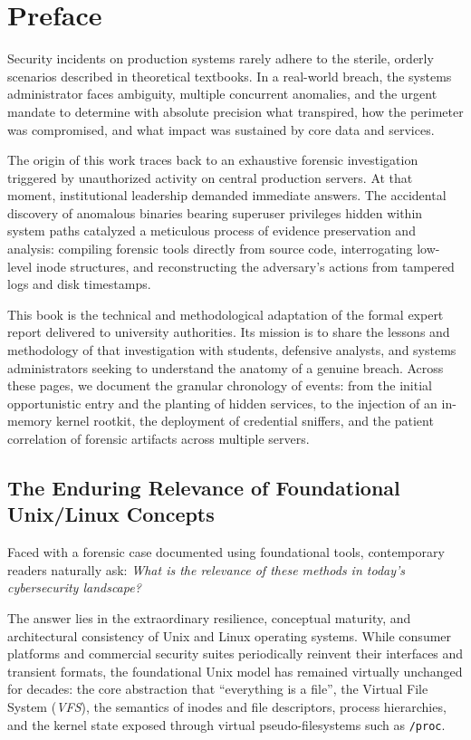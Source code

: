 \chapter*{Preface}

Security incidents on production systems rarely adhere to the sterile, orderly scenarios described in theoretical textbooks. In a real-world breach, the systems administrator faces ambiguity, multiple concurrent anomalies, and the urgent mandate to determine with absolute precision what transpired, how the perimeter was compromised, and what impact was sustained by core data and services.

The origin of this work traces back to an exhaustive forensic investigation triggered by unauthorized activity on central production servers. At that moment, institutional leadership demanded immediate answers. The accidental discovery of anomalous binaries bearing superuser privileges hidden within system paths catalyzed a meticulous process of evidence preservation and analysis: compiling forensic tools directly from source code, interrogating low-level inode structures, and reconstructing the adversary's actions from tampered logs and disk timestamps.

This book is the technical and methodological adaptation of the formal expert report delivered to university authorities. Its mission is to share the lessons and methodology of that investigation with students, defensive analysts, and systems administrators seeking to understand the anatomy of a genuine breach. Across these pages, we document the granular chronology of events: from the initial opportunistic entry and the planting of hidden services, to the injection of an in-memory kernel rootkit, the deployment of credential sniffers, and the patient correlation of forensic artifacts across multiple servers.

\section*{The Enduring Relevance of Foundational Unix/Linux Concepts}

Faced with a forensic case documented using foundational tools, contemporary readers naturally ask: \textit{What is the relevance of these methods in today's cybersecurity landscape?}

The answer lies in the extraordinary resilience, conceptual maturity, and architectural consistency of Unix and Linux operating systems. While consumer platforms and commercial security suites periodically reinvent their interfaces and transient formats, the foundational Unix model has remained virtually unchanged for decades: the core abstraction that ``everything is a file'', the Virtual File System (\textit{VFS}), the semantics of inodes and file descriptors, process hierarchies, and the kernel state exposed through virtual pseudo-filesystems such as \texttt{/proc}.

